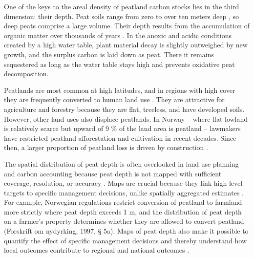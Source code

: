 \documentclass[soil, manuscript]{copernicus}
\begin{document}
One of the keys to the areal density of peatland carbon stocks lies in the third dimension: their depth.
Peat soils range from zero to over ten meters deep \citep{widyastutiPEATGRIDSMappingThickness2024}, so deep peats comprise a large volume.
Their depth results from the accumulation of organic matter over thousands of years \citep{loiselDatabaseSynthesisNorthern2014, joostenRolePeatlandsClimate2016}.
In the anoxic and acidic conditions created by a high water table, plant material decay is slightly outweighed by new growth, and the surplus carbon is laid down as peat.
There it remains sequestered as long as the water table stays high and prevents oxidative peat decomposition.

Peatlands are most common at high latitudes, and in regions with high cover they are frequently converted to human land use \citep{unepGlobalPeatlandsAssessment2022}.
They are attractive for agriculture and forestry because they are flat, treeless, and have developed soils.
However, other land uses also displace peatlands.
In Norway -- where flat lowland is relatively scarce but upward of 9 \% of the land area is peatland \citep{brynLandCoverNorway2018, bakkestuenDelineationWetlandAreas2023} -- lawmakers have restricted peatland afforestation and cultivation in recent decades.
Since then, a larger proportion of peatland loss is driven by construction \citep{flagetMyrMellomLokal2024}.

The spatial distribution of peat depth is often overlooked in land use planning and carbon accounting because peat depth is not mapped with sufficient coverage, resolution, or accuracy \citep{beilmanPeatCarbonStocks2008, hastieRisksCarbonStorage2022, unepGlobalPeatlandsAssessment2022}.
Maps are crucial because they link high-level targets to specific management decisions, unlike spatially aggregated estimates \citep{oecdOECDEnvironmentalPerformance2022}.
For example, Norwegian regulations restrict conversion of peatland to farmland more strictly where peat depth exceeds 1 m, and the distribution of peat depth on a farmer's property determines whether they are allowed to convert peatland (Forskrift om nydyrking, 1997, § 5a).
Maps of peat depth also make it possible to quantify the effect of specific management decisions and thereby understand how local outcomes contribute to regional and national outcomes \citep{oecdOECDEnvironmentalPerformance2022}.
\end{document}
